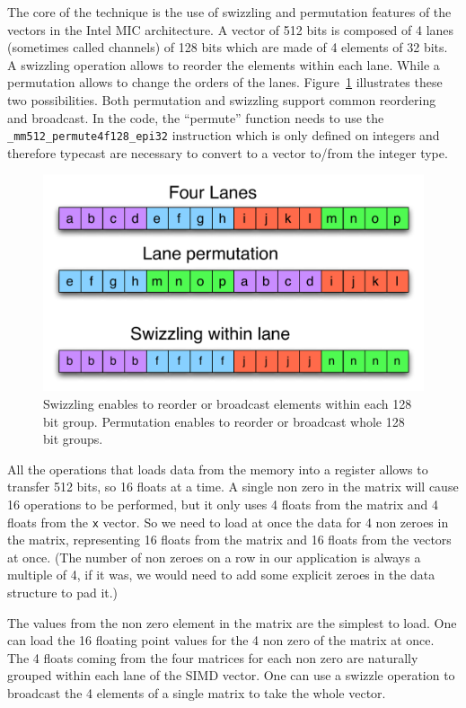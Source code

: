 \documentclass[10pt,conference,compsocconf]{IEEEtran}
\begin{document}
The core of the technique is the use of swizzling and permutation
features of the vectors in the Intel MIC architecture. A vector of 512
bits is composed of 4 lanes (sometimes called channels) of 128 bits
which are made of 4 elements of 32 bits. A swizzling operation allows
to reorder the elements within each lane. While a permutation allows to
change the orders of the lanes. Figure~\ref{fig:swizzling_permutation}
illustrates these two possibilities. Both permutation and swizzling
support common reordering and broadcast. In the code, the ``permute''
function needs to use the {\tt \_mm512\_permute4f128\_epi32}
instruction which is only defined on integers and therefore typecast
are necessary to convert to a vector to/from the integer type.

\begin{figure}
  \centering
  \includegraphics[width=\linewidth]{figures/swizzling_lanes.pdf}
  \caption{Swizzling enables to reorder or broadcast elements within
    each 128 bit group. Permutation enables to reorder or broadcast
    whole 128 bit groups.}
  \label{fig:swizzling_permutation}
\end{figure}

All the operations that loads data from the memory into a register
allows to transfer 512 bits, so 16 floats at a time. A single non zero
in the matrix will cause 16 operations to be performed, but it only
uses 4 floats from the matrix and 4 floats from the {\tt x} vector. So
we need to load at once the data for 4 non zeroes in the matrix,
representing 16 floats from the matrix and 16 floats from the vectors
at once. (The number of non zeroes on a row in our application is
always a multiple of 4, if it was, we would need to add some explicit
zeroes in the data structure to pad it.)

The values from the non zero element in the matrix are the simplest to
load. One can load the 16 floating point values for the 4 non zero of
the matrix at once. The 4 floats coming from the four matrices for
each non zero are naturally grouped within each lane of the SIMD
vector. One can use a swizzle operation to broadcast the 4 elements of
a single matrix to take the whole vector.
\end{document}
